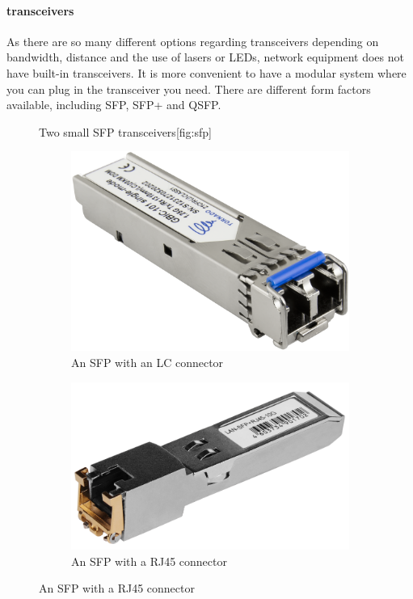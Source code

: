 \paragraph{transceivers}
As there are so many different options regarding transceivers depending on bandwidth, distance and the use of lasers or \acsp{LED}, network equipment does not have built-in transceivers.
It is more convenient to have a modular system where you can plug in the transceiver you need.
There are different form factors available, including \acs{SFP}, \acs{SFP+} and \acs{QSFP}.

\begin{figure}
\begin{sidecaption}{Two small \acf{SFP} transceivers}[fig:sfp]
   \begin{subfigure}[b]{0.45\textwidth}
   \centering
   \includegraphics[width=\textwidth]{images/physical/sfp.png}
   \caption{An \acs{SFP} with an \acs{LC} connector}
   \label{fig:sfp-lc}
   \end{subfigure}
   \hfill
   \begin{subfigure}[b]{0.45\textwidth}
   \centering
   \includegraphics[width=\textwidth]{images/physical/sfp-rj45.png}
   \caption{An \acs{SFP} with a \acs{RJ45} connector}
   \label{fig:sfp-rj45}
   \end{subfigure}
\end{sidecaption}
\end{figure}

